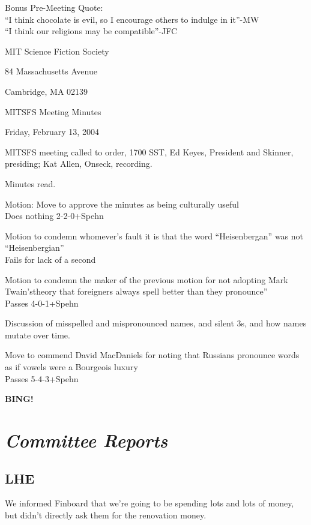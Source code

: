 \documentclass[10pt]{article}
\newcommand{\bing}{{\bf BING!} }
\newcommand{\goto}[1]{\bing \vskip 12pt \section*{{\em{#1}}}}
\begin{document}
Bonus Pre-Meeting Quote:\\
``I think chocolate is evil, so I encourage others to indulge in it''-MW\\
``I think our religions may be compatible''-JFC

\begin{center}

MIT Science Fiction Society 

84 Massachusetts Avenue

Cambridge, MA 02139

\vspace{12pt}

MITSFS Meeting Minutes 

Friday, February 13, 2004

\end{center}
 
\vspace{18pt}

\setlength{\parskip}{6pt}

\noindent
MITSFS meeting called to order, 1700 SST, Ed Keyes, President and
Skinner, presiding; Kat Allen,  Onseck, recording.

Minutes read.

Motion: Move to approve the minutes as being culturally useful\\
Does nothing 2-2-0+Spehn

Motion to condemn whomever's fault it is that the word ``Heisenbergan'' was not ``Heisenbergian''\\
Fails for lack of a second

Motion to condemn the maker of the previous motion for not adopting
Mark Twain'stheory that foreigners always spell better than they
pronounce''\\
 Passes 4-0-1+Spehn
 
 Discussion of misspelled and mispronounced names, and silent 3s, and
 how names mutate over time.

Move to commend David MacDaniels for noting that Russians pronounce words as if vowels were a Bourgeois luxury\\
Passes 5-4-3+Spehn

\goto{Committee Reports}
\subsection*{LHE}
We informed Finboard that we're going to be spending lots and lots of
money, but didn't directly ask them for the renovation money.
\end{document}
